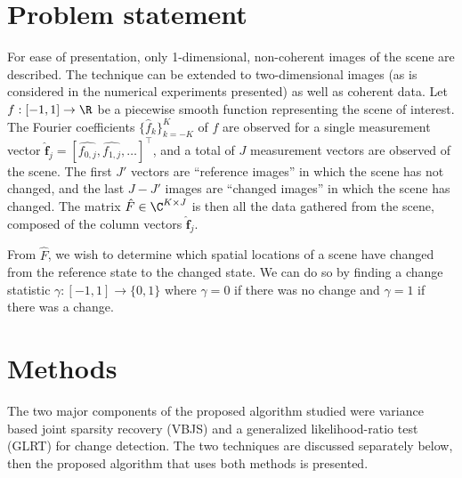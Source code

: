 \documentclass{article}
\begin{document}
\section{Problem statement}\label{sec:problem}

For ease of presentation, only 1-dimensional, non-coherent images of the scene are described. The technique can be extended to two-dimensional images (as is considered in the numerical experiments presented) as well as coherent data. Let $f: [-1,1] \to \R$ be a piecewise smooth function representing the scene of interest. The Fourier coefficients $\{\hat{f}_k\}_{k=-K}^{K}$ of $f$ are observed for a single measurement vector $\hat{\mathbf{f}}_j = [\hat{f_{0,j}}, \hat{f_{1,j}}, \dots]^\top$, and a total of $J$ measurement vectors are observed of the scene. The first $J'$ vectors are ``reference images'' in which the scene has not changed, and the last $J-J'$ images are ``changed images'' in which the scene has changed.
The matrix $\hat{F} \in \C^{K \times J}$ is then all the data gathered from the scene, composed of the column vectors $\hat{\mathbf{f}}_j$.

From $\hat{F}$, we wish to determine which spatial locations of a scene have changed from the reference state to the changed state. We can do so by finding a change statistic $\gamma: [-1,1] \to \{0, 1\}$ where $\gamma=0$ if there was no change and $\gamma = 1$ if there was a change.




\section{Methods}

The two major components of the proposed algorithm studied were variance based joint sparsity recovery (VBJS) and a generalized likelihood-ratio test (GLRT) for change detection. The two techniques are discussed separately below, then the proposed algorithm that uses both methods is presented.
\end{document}
